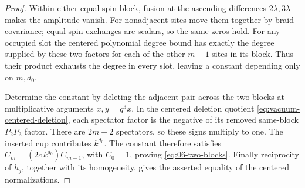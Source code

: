 \begin{proof}
Within either equal-spin block, fusion at the ascending differences
\(2\lambda,3\lambda\) makes the amplitude vanish.  For nonadjacent
sites move them together by braid covariance; equal-spin exchanges
are scalars, so the same zeros hold.  For any occupied slot the
centered polynomial degree bound has exactly the degree supplied by
these two factors for each of the other \(m-1\) sites in its block.
Thus their product exhausts the degree in every slot, leaving a
constant depending only on \(m,d_0\).

Determine the constant by deleting the adjacent pair across the two
blocks at multiplicative arguments \(x,y=q^3x\).
In the centered deletion quotient
\eqref{eq:vacuum-centered-deletion}, each spectator factor is the
negative of its removed same-block
\(P_2P_3\) factor.  There are \(2m-2\) spectators, so these signs
multiply to one.  The inserted cup contributes \(k^{d_0}\).
The constant therefore satisfies
\(C_m=(2c\,k^{d_0})C_{m-1}\), with \(C_0=1\), proving
\eqref{eq:06-two-blocks}.  Finally reciprocity of \(h_j\), together
with its homogeneity, gives the asserted equality of the centered
normalizations.
\end{proof}

